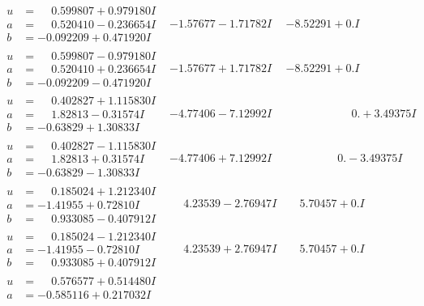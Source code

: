 \documentclass[1p]{elsarticle_modified}
\theoremstyle{definition}
\begin{document}
$$\begin{array}{c|c|c}
\begin{aligned}
u &= \phantom{-}0.599807 + 0.979180 I \\
a &= \phantom{-}0.520410 - 0.236654 I \\
b &= -0.092209 + 0.471920 I\end{aligned}
 & -1.57677 - 1.71782 I & -8.52291 + 0. I\phantom{ +0.000000I} \\ \hline\begin{aligned}
u &= \phantom{-}0.599807 - 0.979180 I \\
a &= \phantom{-}0.520410 + 0.236654 I \\
b &= -0.092209 - 0.471920 I\end{aligned}
 & -1.57677 + 1.71782 I & -8.52291 + 0. I\phantom{ +0.000000I} \\ \hline\begin{aligned}
u &= \phantom{-}0.402827 + 1.115830 I \\
a &= \phantom{-}1.82813 - 0.31574 I \\
b &= -0.63829 + 1.30833 I\end{aligned}
 & -4.77406 - 7.12992 I & \phantom{-0.000000 -}0. + 3.49375 I \\ \hline\begin{aligned}
u &= \phantom{-}0.402827 - 1.115830 I \\
a &= \phantom{-}1.82813 + 0.31574 I \\
b &= -0.63829 - 1.30833 I\end{aligned}
 & -4.77406 + 7.12992 I & \phantom{-0.000000 } 0. - 3.49375 I \\ \hline\begin{aligned}
u &= \phantom{-}0.185024 + 1.212340 I \\
a &= -1.41955 + 0.72810 I \\
b &= \phantom{-}0.933085 - 0.407912 I\end{aligned}
 & \phantom{-}4.23539 - 2.76947 I & \phantom{-}5.70457 + 0. I\phantom{ +0.000000I} \\ \hline\begin{aligned}
u &= \phantom{-}0.185024 - 1.212340 I \\
a &= -1.41955 - 0.72810 I \\
b &= \phantom{-}0.933085 + 0.407912 I\end{aligned}
 & \phantom{-}4.23539 + 2.76947 I & \phantom{-}5.70457 + 0. I\phantom{ +0.000000I} \\ \hline\begin{aligned}
u &= \phantom{-}0.576577 + 0.514480 I \\
a &= -0.585116 + 0.217032 I \\

\end{aligned}
\end{array}$$
\end{document}
